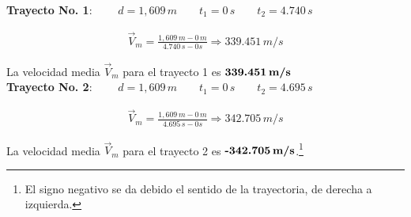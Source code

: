 \documentclass[11pt,letterpaper]{article}
\begin{document}
\textbf{Trayecto No. 1}: $\qquad d=1,609\,m \qquad t_{1} = 0\,s \qquad t_{2} = 4.740\,s$

\begin{align}
\vec{V}_{m} = \frac{1,609\,m - 0\,m}{4.740\,s - 0 s} \Rightarrow 339.451\,m/s
\end{align}

La velocidad media $\vec{V}_{m}$ para el trayecto 1 es $\textbf{339.451\,m/s}$\\

\textbf{Trayecto No. 2}: $\qquad d=1,609\,m \qquad t_{1} = 0\,s \qquad t_{2} = 4.695\,s$

\begin{align}
\vec{V}_{m} = \frac{1,609\,m - 0\,m}{4.695\,s - 0 s} \Rightarrow 342.705\,m/s
\end{align}

La velocidad media $\vec{V}_{m}$ para el trayecto 2 es $\textbf{-342.705\,m/s}$.\footnote{El signo negativo se da debido el sentido de la trayectoria, de derecha a izquierda.}

\end{document}
